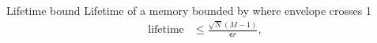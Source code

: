 \documentclass{beamer}%
\DeclareMathOperator{\snr}{SNR}
\newcommand{\initial}{\mathcal{I}}
\newcommand{\area}{\mathcal{A}}
\newcommand{\CS}{\mathcal{S}}
\renewcommand{\e}{\mathsf{e}}
\begin{document}
\begin{frame}{Lifetime bound}
%
 Lifetime of a memory bounded by where envelope crosses 1
 \begin{equation*}
 \begin{aligned}
   \text{lifetime} &\leq \frac{\sqrt{N}(M-1)}{\e r}, \\
 \end{aligned}
 \end{equation*}
%
\end{frame}

%
%
%
\end{document}
